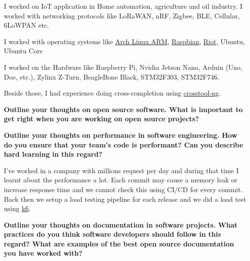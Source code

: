I worked on IoT application in Home automation, agriculture and oil industry. I worked with networking protocols
like LoRaWAN, nRF, Zigbee, BLE, Cellular, 6LoWPAN etc.

I worked with operating systems like \href{https://archlinuxarm.org/}{Arch Linux ARM}, \href{https://www.raspbian.org/}{Raspbian},
\href{https://www.riot-os.org/}{Riot}, Ubuntu, Ubuntu Core

I worked on the Hardwars like Raspberry Pi, Nvidia Jetson Nano, Arduin (Uno, Doe, etc.), Zylinx Z-Turn, BeagleBone Black,
STM32F303, STM32F746.

Beside those, I had experience doing cross-completion using \href{https://github.com/crosstool-ng/crosstool-ng}{crosstool-ng}.

\textbf{Outline your thoughts on open source software. What is important to get right when you are working on open source projects?}

\textbf{Outline your thoughts on performance in software engineering. How do you ensure that your team's code is performant? Can you describe hard learning in this regard?}

I've worked in a company with millions request per day and during that time I learnt about the performance a lot.
Each commit may cause a memory leak or increase response time and we cannot check this using CI/CD for every commit.
Back then we setup a load testing pipeline for each release and we did a load test using \href{https://github.com/grafana/k6}{k6}.

\textbf{Outline your thoughts on documentation in software projects. What practices do you think software developers should follow in this regard? What are examples of the best open source documentation you have worked with?}
